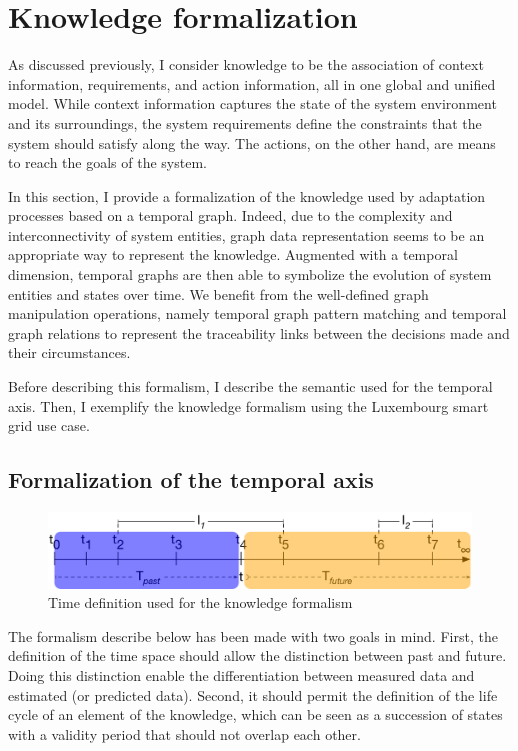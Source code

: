 \section{Knowledge formalization}
 
  As discussed previously, I consider \gls{knowledge} to be the association of \gls{context} information, \glspl{requirement}, and \gls{action} information, all in one global and unified model.
 While \gls{context} information captures the state of the system environment and its surroundings, the system \glspl{requirement} define the constraints that the system should satisfy along the way. 
 The \glspl{action}, on the other hand, are means to reach the goals of the system.
  
 In this section, I provide a formalization of the \gls{knowledge} used by adaptation processes based on a temporal graph. 
Indeed, due to the complexity and interconnectivity of system entities, graph data representation seems to be an appropriate way to represent the \gls{knowledge}. 
Augmented with a temporal dimension, temporal graphs are then able to symbolize the evolution of system entities and states over time. 
We benefit from the well-defined graph manipulation operations, namely temporal graph pattern matching and temporal graph relations to represent the traceability links between the \glspl{decision} made and their \glspl{circumstance}.

Before describing this formalism, I describe the semantic used for the temporal axis.
Then, I exemplify the knowledge formalism using the Luxembourg smart grid use case.

\subsection{Formalization of the temporal axis}
\label{sec:tkm:timeDef}

\begin{figure}
   \centering
	\includegraphics[width=\textwidth]{img/chapt-tkm/formalism/formalismeTime}
	\caption{Time definition used for the knowledge formalism}
	\label{fig:tkm:formalismeTime}
\end{figure}

The formalism describe below has been made with two goals in mind.
First, the definition of the time space should allow the distinction between past and future. 
Doing this distinction enable the differentiation between measured data and estimated (or predicted data).
Second, it should permit the definition of the life cycle of an element of the \gls{knowledge}, which can be seen as a succession of states with a validity period that should not overlap each other.

